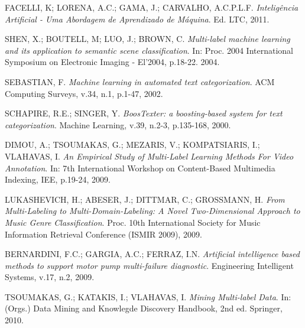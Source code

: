 
\begin{thebibliography}{10}

        {FACELLI, K; LORENA, A.C.; GAMA, J.; CARVALHO, A.C.P.L.F.
        \textit{Inteligência Artificial - Uma Abordagem de Aprendizado de Máquina}. 
        Ed. LTC, 2011.}

        {SHEN, X.; BOUTELL, M; LUO, J.; BROWN, C.
        \textit{Multi-label machine learning and its application to semantic scene classification}. 
        In: Proc. 2004 International Symposium on Electronic Imaging - El'2004, p.18-22. 2004.}

        {SEBASTIAN, F.
        \textit{Machine learning in automated text categorization}. 
        ACM Computing Surveys, v.34, n.1, p.1-47, 2002.}

        {SCHAPIRE, R.E.; SINGER, Y.
        \textit{BoosTexter: a boosting-based system for text categorization}. 
        Machine Learning, v.39, n.2-3, p.135-168, 2000.}

        {DIMOU, A.; TSOUMAKAS, G.; MEZARIS, V.; KOMPATSIARIS, I.; VLAHAVAS, I.
        \textit{An Empirical Study of Multi-Label Learning Methods For Video Annotation}. 
        In: 7th International Workshop on Content-Based Multimedia Indexing, IEE, p.19-24, 2009.}
        
        {LUKASHEVICH, H.; ABESER, J.; DITTMAR, C.; GROSSMANN, H.
        \textit{From Multi-Labeling to Multi-Domain-Labeling: A Novel Two-Dimensional Approach to Music Genre Classification}. 
        Proc. 10th International Society for Music Information Retrieval Conference (ISMIR 2009), 2009.}

        {BERNARDINI, F.C.; GARGIA, A.C.; FERRAZ, I.N. 
        \textit{Artificial intelligence based methods to support motor pump multi-failure diagnostic}. 
        Engineering Intelligent Systems, v.17, n.2, 2009.}

        {TSOUMAKAS, G.; KATAKIS, I.; VLAHAVAS, I.
        \textit{Mining Multi-label Data}. 
        In: (Orgs.) Data Mining and Knowlegde Discovery Handbook, 2nd ed. Springer, 2010.}


\end{thebibliography}
